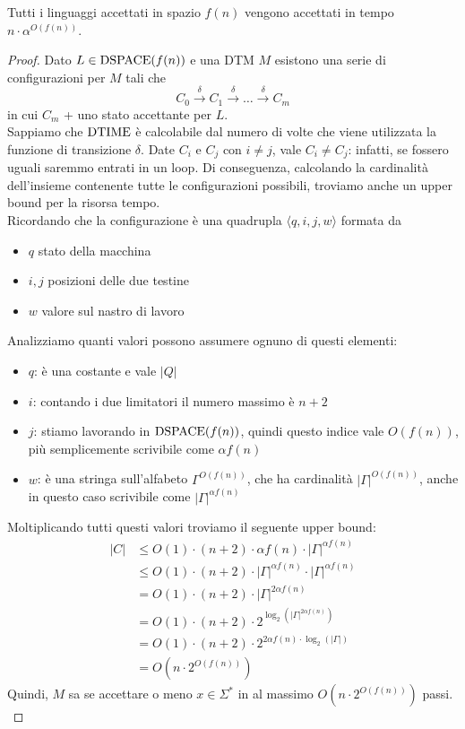 \begin{theor}
	Tutti i linguaggi accettati in spazio $f(n)$ vengono accettati in tempo $n \cdot \alpha^{O(f(n))}$.
\end{theor}
\begin{proof}
	Dato $L \in \text{DSPACE} (f(n))$ e una DTM $M$ esistono una serie di configurazioni per $M$ tali che
	$$ C_0 \xrightarrow{\delta} C_1 \xrightarrow{\delta} \dots \xrightarrow{\delta} C_m $$
	in cui $C_m$ + uno stato accettante per $L$.\\
	
	Sappiamo che $\text{DTIME}$ è calcolabile dal numero di volte che viene utilizzata la funzione di transizione $\delta$. Date $C_i$ e $C_j$ con $i \neq j$, vale $C_i \neq C_j$: infatti, se fossero uguali saremmo entrati in un loop. Di conseguenza, calcolando la cardinalità dell'insieme contenente tutte le configurazioni possibili, troviamo anche un upper bound per la risorsa tempo.\\
	
	Ricordando che la configurazione è una quadrupla $\langle q, i, j, w \rangle$ formata da
	\begin{itemize}
		\item $q$ stato della macchina
		\item $i,j$ posizioni delle due testine
		\item $w$ valore sul nastro di lavoro
	\end{itemize}
	
	Analizziamo quanti valori possono assumere ognuno di questi elementi:
	\begin{itemize}
		\item $q$: è una costante e vale $|Q|$
		\item $i$: contando i due limitatori il numero massimo è $n+2$
		\item $j$: stiamo lavorando in $\text{DSPACE} (f(n))$, quindi questo indice vale $O(f(n))$, più semplicemente scrivibile come $\alpha f(n)$
		\item $w$: è una stringa sull'alfabeto $\Gamma^{O(f(n))}$, che ha cardinalità $|\Gamma|^{O(f(n))}$, anche in questo caso scrivibile come $|\Gamma|^{\alpha f(n)}$
	\end{itemize}
	
	Moltiplicando tutti questi valori troviamo il seguente upper bound: 
	\begin{align*}
		|C| & \leq O(1) \cdot (n + 2) \cdot \alpha f (n) \cdot |\Gamma|^{\alpha f (n)} \\
		& \leq O(1) \cdot (n + 2) \cdot |\Gamma|^{\alpha f(n)} \cdot |\Gamma|^{\alpha f(n)} \\
		& = O(1) \cdot (n + 2) \cdot |\Gamma|^{2 \alpha f (n)} \\
		& = O(1) \cdot (n + 2) \cdot 2^{\log_2 \left(|\Gamma|^{2 \alpha f(n)}\right)} \\
		& = O(1) \cdot (n + 2) \cdot 2^{2 \alpha f(n) \cdot \log_2 \left(|\Gamma|\right)} \\
		& = O \left(n \cdot 2^{O(f(n))}\right)
	\end{align*}
	Quindi, $M$ sa se accettare o meno $x \in \Sigma^\ast$ in al massimo $O\left(n \cdot 2^{O(f(n))}\right)$ passi.\\
	

\end{proof}
